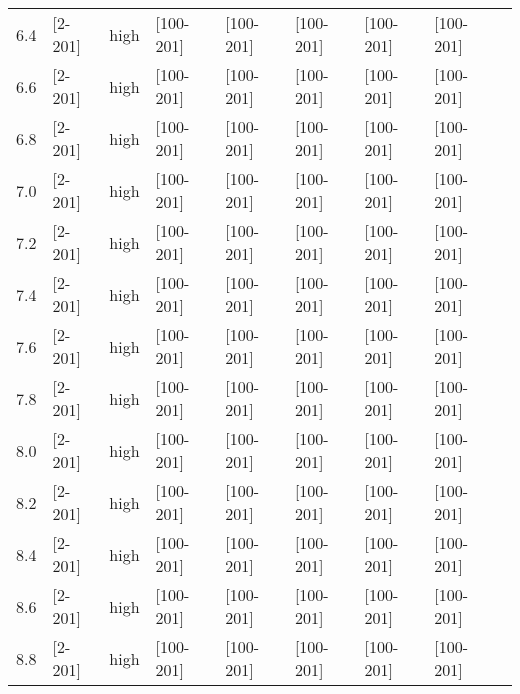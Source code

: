 \documentclass[11pt]{article}
\begin{document}
\begin{tabular}{| l | l | l | l | l | l | l | l | l |}
      6.4 & [2-201] & high & [100-201] & [100-201] & [100-201] & [100-201] & [100-201] &\\
      6.6 & [2-201] & high & [100-201] & [100-201] & [100-201] & [100-201] & [100-201] &\\
      6.8 & [2-201] & high & [100-201] & [100-201] & [100-201] & [100-201] & [100-201] &\\
      7.0 & [2-201] & high & [100-201] & [100-201] & [100-201] & [100-201] & [100-201] &\\
      7.2 & [2-201] & high & [100-201] & [100-201] & [100-201] & [100-201] & [100-201] &\\
      7.4 & [2-201] & high & [100-201] & [100-201] & [100-201] & [100-201] & [100-201] &\\
      7.6 & [2-201] & high & [100-201] & [100-201] & [100-201] & [100-201] & [100-201] &\\
      7.8 & [2-201] & high & [100-201] & [100-201] & [100-201] & [100-201] & [100-201] &\\
      8.0 & [2-201] & high & [100-201] & [100-201] & [100-201] & [100-201] & [100-201] &\\
      8.2 & [2-201] & high & [100-201] & [100-201] & [100-201] & [100-201] & [100-201] &\\
      8.4 & [2-201] & high & [100-201] & [100-201] & [100-201] & [100-201] & [100-201] &\\
      8.6 & [2-201] & high & [100-201] & [100-201] & [100-201] & [100-201] & [100-201] &\\
      8.8 & [2-201] & high & [100-201] & [100-201] & [100-201] & [100-201] & [100-201] &\\
      \hline
    \end{tabular}
\end{document}
